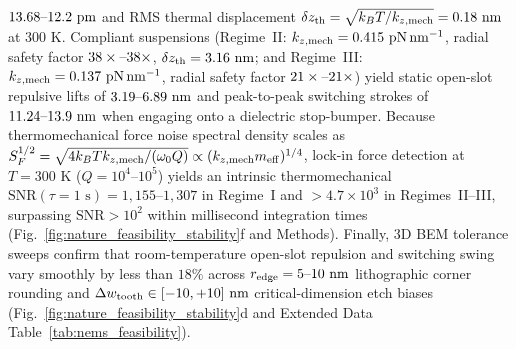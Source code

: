 \documentclass[pdflatex,sn-nature]{sn-jnl}
\DeclareRobustCommand{\roundzero}[1]{\fpeval{round(#1,0)}}
\DeclareRobustCommand{\roundtwo}[1]{\fpeval{round(#1,2)}}
\DeclareRobustCommand{\roundthree}[1]{\fpeval{round(#1,3)}}
\begin{document}
$\roundtwo{\NatureCantorNtwoHybridrzLateralStabilityEquilibriumAxialRepulsiveLiftPm}\text{--}\roundtwo{\NatureRotCeightCompactNtwoLateralStabilityEquilibriumAxialRepulsiveLiftPm}\text{ pm}$ and RMS thermal displacement $\delta z_{\rm th} = \sqrt{k_B T / k_{z,\rm mech}} = 0.18\text{ nm}$ at $300\text{ K}$. Compliant suspensions (Regime~II: $k_{z,\rm mech} = \roundthree{\NatureRotCeightCompactNtwoLateralStabilityNmActuatorKZMechPnPerNm}\text{ pN}\,\text{nm}^{-1}$, radial safety factor $\roundzero{\NatureCantorNtwoHybridrzLateralStabilityNmActuatorLateralSafetyFactor}\times\text{--}\roundzero{\NatureRotCeightCompactNtwoLateralStabilityNmActuatorLateralSafetyFactor}\times$, $\delta z_{\rm th} = 3.16\text{ nm}$; and Regime~III: $k_{z,\rm mech} = \roundthree{\NatureRotCeightCompactNtwoLateralStabilityCompactClutchKZMechPnPerNm}\text{ pN}\,\text{nm}^{-1}$, radial safety factor $\roundzero{\NatureCantorNtwoHybridrzLateralStabilityCompactClutchLateralSafetyFactor}\times\text{--}\roundzero{\NatureRotCeightCompactNtwoLateralStabilityCompactClutchLateralSafetyFactor}\times$) yield static open-slot repulsive lifts of $\roundtwo{\NatureCantorNtwoHybridrzLateralStabilityNmActuatorBasinEqLiftNm}\text{--}\roundtwo{\NatureCantorNtwoHybridrzLateralStabilityCompactClutchBasinEqLiftNm}\text{ nm}$ and peak-to-peak switching strokes of $\roundtwo{\NatureCantorNtwoHybridrzLateralStabilityNmActuatorPeakToPeakStrokeNm}\text{--}\roundtwo{\NatureRotCeightCompactNtwoLateralStabilityNmActuatorPeakToPeakStrokeNm}\text{ nm}$ when engaging onto a dielectric stop-bumper. Because thermomechanical force noise spectral density scales as $S_F^{1/2} = \sqrt{4 k_B T k_{z,\rm mech}/(\omega_0 Q)} \propto (k_{z,\rm mech} m_{\rm eff})^{1/4}$, lock-in force detection at $T = 300\text{ K}$ ($Q = 10^4\text{--}10^5$) yields an intrinsic thermomechanical $\mathrm{SNR}(\tau=1\text{ s}) = 1{,}155\text{--}1{,}307$ in Regime~I and $>4.7\times 10^3$ in Regimes~II--III, surpassing $\mathrm{SNR} > 10^2$ within millisecond integration times (Fig.~\ref{fig:nature_feasibility_stability}f and Methods). Finally, 3D BEM tolerance sweeps confirm that room-temperature open-slot repulsion and switching swing vary smoothly by less than $18\%$ across $r_{\rm edge} = 5\text{--}10\text{ nm}$ lithographic corner rounding and $\Delta w_{\rm tooth} \in [-10, +10]\text{ nm}$ critical-dimension etch biases (Fig.~\ref{fig:nature_feasibility_stability}d and Extended Data Table~\ref{tab:nems_feasibility}).
\end{document}
